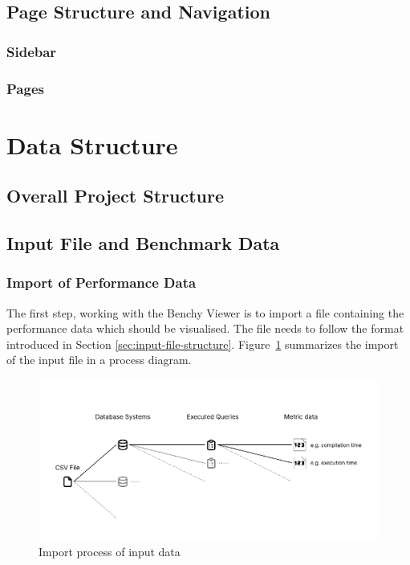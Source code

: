 \subsection{Page Structure and Navigation}
\subsubsection{Sidebar}
\subsubsection{Pages}

\section{Data Structure}
\subsection{Overall Project Structure}
\subsection{Input File and Benchmark Data}


\subsubsection{Import of Performance Data}

The first step, working with the Benchy Viewer is to import a file containing the performance data which should be visualised. The file needs to follow the format introduced in Section \ref{sec:input-file-structure}. Figure~\ref{fig:input-process-flow} summarizes the import of the input file in a process diagram.

\begin{figure}[h]
  \centering
  \includegraphics[width=1\linewidth]{figures/csv-structure.pdf}
  \caption{Import process of input data}
  \label{fig:input-process-flow}
\end{figure}

